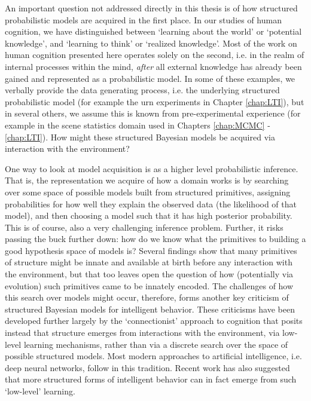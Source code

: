 An important question not addressed directly in this thesis is of how structured probabilistic models are acquired in the first place. In our studies of human cognition, we have distinguished between `learning about the world' or `potential knowledge', and `learning to think' or `realized knowledge'. Most of the work on human cognition presented here operates solely on the second, i.e. in the realm of internal processes within the mind, \textit{after} all external knowledge has already been gained and represented as a probabilistic model. In some of these examples, we verbally provide the data generating process, i.e. the underlying structured probabilistic model (for example the urn experiments in Chapter \ref{chap:LTI}), but in several others, we assume this is known from pre-experimental experience (for example in the scene statistics domain used in Chapters \ref{chap:MCMC} - \ref{chap:LTI}). How might these structured Bayesian models be acquired via interaction with the environment?

One way to look at model acquisition is as a higher level probabilistic inference. That is, the representation we acquire of how a domain works is by searching over some space of possible models built from structured primitives, assigning probabilities for how well they explain the observed data (the likelihood of that model), and then choosing a model such that it has high posterior probability. This is of course, also a very challenging inference problem\citep{schulz2012finding, bramley2018grounding}. Further, it risks passing the buck further down: how do we know what the primitives to building a good hypothesis space of models is? Several findings show that many primitives of structure might be innate and available at birth before any interaction with the environment\citep{spelke1998nativism, chomsky1967recent}, but that too leaves open the question of how (potentially via evolution) such primitives came to be innately encoded. The challenges of how this search over models might occur, therefore, forms another key criticism of structured Bayesian models for intelligent behavior. These criticisms have been developed further largely by the `connectionist' approach to cognition\citep{rogers2004semantic, mcclelland2010letting} that posits instead that structure emerges from interactions with the environment, via low-level learning mechanisms, rather than via a discrete search over the space of possible structured models. Most modern approaches to artificial intelligence, i.e. deep neural networks, follow in this tradition. Recent work has also suggested that more structured forms of intelligent behavior can in fact emerge from such `low-level' learning\citep{dasgupta2019causal, wang2018, botvinick2019reinforcement}.

